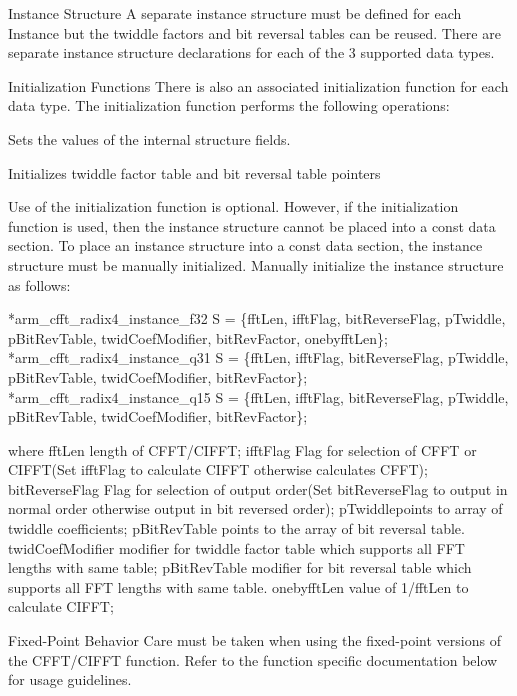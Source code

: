 \begin{DoxyParagraph}{Instance Structure }
A separate instance structure must be defined for each Instance but the twiddle factors and bit reversal tables can be reused. There are separate instance structure declarations for each of the 3 supported data types.
\end{DoxyParagraph}
\begin{DoxyParagraph}{Initialization Functions }
There is also an associated initialization function for each data type. The initialization function performs the following operations\-:
\begin{DoxyItemize}
\item Sets the values of the internal structure fields.
\item Initializes twiddle factor table and bit reversal table pointers 
\end{DoxyItemize}
\end{DoxyParagraph}
\begin{DoxyParagraph}{}
Use of the initialization function is optional. However, if the initialization function is used, then the instance structure cannot be placed into a const data section. To place an instance structure into a const data section, the instance structure must be manually initialized. Manually initialize the instance structure as follows\-: 
\begin{DoxyPre}    
*arm\_cfft\_radix4\_instance\_f32 S = \{fftLen, ifftFlag, bitReverseFlag, pTwiddle, pBitRevTable, twidCoefModifier, bitRevFactor, onebyfftLen\};    
*arm\_cfft\_radix4\_instance\_q31 S = \{fftLen, ifftFlag, bitReverseFlag, pTwiddle, pBitRevTable, twidCoefModifier, bitRevFactor\};    
*arm\_cfft\_radix4\_instance\_q15 S = \{fftLen, ifftFlag, bitReverseFlag, pTwiddle, pBitRevTable, twidCoefModifier, bitRevFactor\};    
  \end{DoxyPre}
 
\end{DoxyParagraph}
\begin{DoxyParagraph}{}
where {\ttfamily fft\-Len} length of C\-F\-F\-T/\-C\-I\-F\-F\-T; {\ttfamily ifft\-Flag} Flag for selection of C\-F\-F\-T or C\-I\-F\-F\-T(\-Set ifft\-Flag to calculate C\-I\-F\-F\-T otherwise calculates C\-F\-F\-T); {\ttfamily bit\-Reverse\-Flag} Flag for selection of output order(\-Set bit\-Reverse\-Flag to output in normal order otherwise output in bit reversed order); {\ttfamily p\-Twiddle}points to array of twiddle coefficients; {\ttfamily p\-Bit\-Rev\-Table} points to the array of bit reversal table. {\ttfamily twid\-Coef\-Modifier} modifier for twiddle factor table which supports all F\-F\-T lengths with same table; {\ttfamily p\-Bit\-Rev\-Table} modifier for bit reversal table which supports all F\-F\-T lengths with same table. {\ttfamily onebyfft\-Len} value of 1/fft\-Len to calculate C\-I\-F\-F\-T;
\end{DoxyParagraph}
\begin{DoxyParagraph}{Fixed-\/\-Point Behavior }
Care must be taken when using the fixed-\/point versions of the C\-F\-F\-T/\-C\-I\-F\-F\-T function. Refer to the function specific documentation below for usage guidelines. 
\end{DoxyParagraph}



